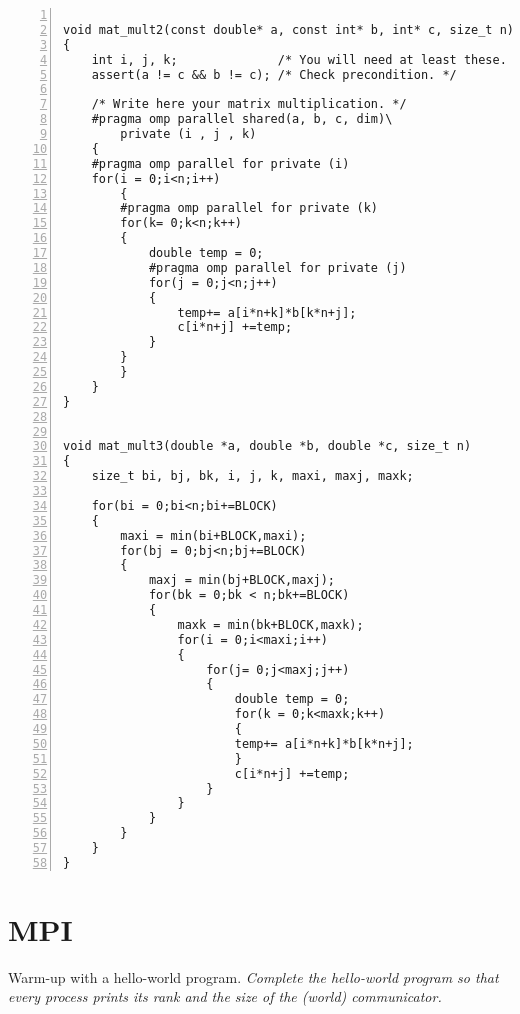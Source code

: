 \documentclass{article}
\begin{document}
\begin{lstlisting}[basicstyle=\small\sffamily,
keywords={break,case,const,continue,default,else,enum,
for,if,return,switch,while,do,long,void,int,float,double,
char,struct,typedef,include,size\_t},
keywordstyle={\color{blue}},
comment={[l]{//}}, morecomment={[s]{/*}{*/}}, commentstyle=\itshape,
columns={[l]flexible}, numbers=left, numberstyle=\tiny,
frameround=fftt, frame=shadowbox, captionpos=b,
caption={Your OpenMP implementation.},
label=LST:openmp]

void mat_mult2(const double* a, const int* b, int* c, size_t n)
{
    int i, j, k;              /* You will need at least these. */
    assert(a != c && b != c); /* Check precondition. */

    /* Write here your matrix multiplication. */
	#pragma omp parallel shared(a, b, c, dim)\
		private (i , j , k)
	{
	#pragma omp parallel for private (i)
    for(i = 0;i<n;i++)
		{
		#pragma omp parallel for private (k)
        for(k= 0;k<n;k++)
        {
            double temp = 0;
			#pragma omp parallel for private (j)
            for(j = 0;j<n;j++)
            {
                temp+= a[i*n+k]*b[k*n+j];
                c[i*n+j] +=temp;
			}
	    }
		}
	}
}


void mat_mult3(double *a, double *b, double *c, size_t n)
{
    size_t bi, bj, bk, i, j, k, maxi, maxj, maxk;

    for(bi = 0;bi<n;bi+=BLOCK)
    {
        maxi = min(bi+BLOCK,maxi);
        for(bj = 0;bj<n;bj+=BLOCK)
        {
            maxj = min(bj+BLOCK,maxj);
            for(bk = 0;bk < n;bk+=BLOCK)
            {
                maxk = min(bk+BLOCK,maxk);
                for(i = 0;i<maxi;i++)
                {
                    for(j= 0;j<maxj;j++)
                    {
                        double temp = 0;
                        for(k = 0;k<maxk;k++)
                        {
                        temp+= a[i*n+k]*b[k*n+j];
                        }
                        c[i*n+j] +=temp;
                    }
                }
            }
        }
    }
}
\end{lstlisting}

\section{MPI}

\begin{ExerciseList}
\Exercise Warm-up with a hello-world program.
\Question \emph{Complete the hello-world program so that every process
  prints its rank and the size of the (world) communicator.}
\end{ExerciseList}
\end{document}
